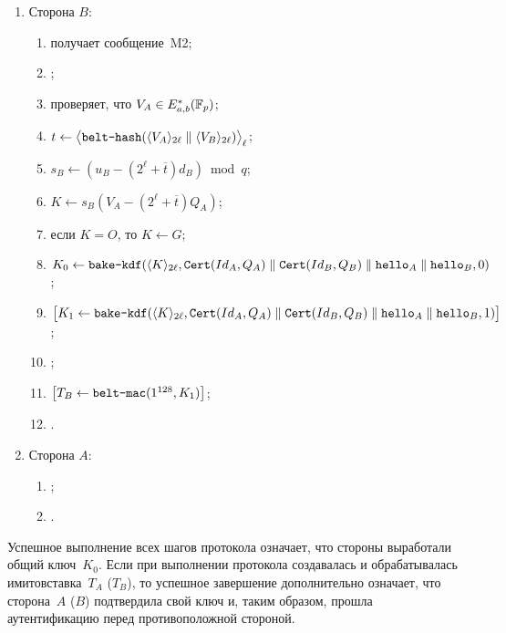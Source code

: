 \begin{enumerate}
\item
Сторона $B$:
\begin{enumerate}
\item
получает сообщение~M2;
\item
{};
\item
проверяет, что $V_A\in E_{a,b}^*(\mathbb{F}_p)$;
\item
$t\leftarrow\bigl\langle
\texttt{belt-hash}
(\langle V_A\rangle_{2\ell}\parallel\langle V_B\rangle_{2\ell})
\bigr\rangle_\ell$;
\item
$s_B\leftarrow (u_B-(2^\ell+\overline{t})d_B)\bmod q$;
\item
$K\leftarrow s_B(V_A-(2^\ell+\overline{t})Q_A)$;
\item
если $K=O$, то $K\leftarrow G$;
\item
$K_0\leftarrow\texttt{bake-kdf}
(\langle K\rangle_{2\ell},
\texttt{Cert}(Id_A,Q_A)\parallel \texttt{Cert}(Id_B,Q_B)\parallel 
\texttt{hello}_A\parallel\texttt{hello}_B,
0)$;
\item
$\mathbf{\bigl[}
K_1\leftarrow\texttt{bake-kdf}
(\langle K\rangle_{2\ell},
\texttt{Cert}(Id_A,Q_A)\parallel \texttt{Cert}(Id_B,Q_B)\parallel 
\texttt{hello}_A\parallel\texttt{hello}_B,
1)\mathbf{\bigr]}$;
\item
{};
\item
$\mathbf{\bigl[}T_B\leftarrow\texttt{belt-mac}(1^{128},K_1)\mathbf{\bigr]}$;
\item
{}.
\end{enumerate}

\item
Сторона $A$:
\begin{enumerate}
\item
{};
\item
{}.
\end{enumerate}
\end{enumerate}

Успешное выполнение всех шагов протокола означает, что 
стороны выработали общий ключ~$K_0$.
%
Если при выполнении протокола  
создавалась и обрабатывалась имитовставка~$T_A$ ($T_B$),
то успешное завершение дополнительно означает,
что сторона~$A$ ($B$) подтвердила свой ключ и, таким образом, 
прошла аутентификацию перед противоположной стороной.

